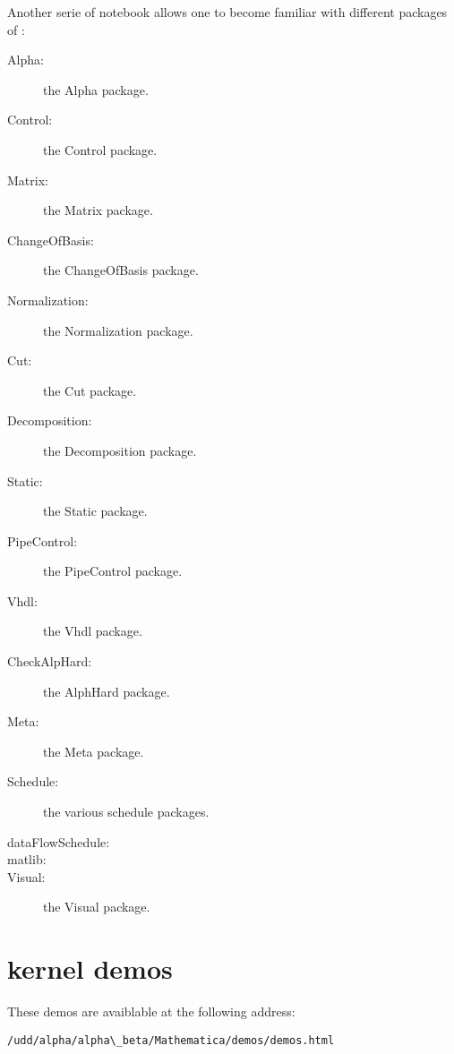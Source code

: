 Another serie of notebook allows one to become familiar with
different packages of \mmalfa{}: 
\begin{description}
\item[Alpha: ] the Alpha package.
\item[Control: ] the Control package.
\item[Matrix: ] the Matrix package.
\item[ChangeOfBasis: ] the ChangeOfBasis package.
\item[Normalization: ] the Normalization package.
\item[Cut: ] the Cut package.
\item[Decomposition: ] the Decomposition package.
\item[Static: ] the Static package.
\item[PipeControl: ] the PipeControl package. 
\item[Vhdl: ] the Vhdl package.
\item[CheckAlpHard: ] the AlphHard package.
\item[Meta: ] the Meta package.
\item[Schedule: ] the various schedule packages.
\item[dataFlowSchedule: ] 

\item[matlib: ]

\item[Visual: ] the Visual package. 

\end{description}



\section{kernel demos}
These demos are avaiblable at the following address:
\begin{verbatim}
/udd/alpha/alpha\_beta/Mathematica/demos/demos.html
\end{verbatim}

